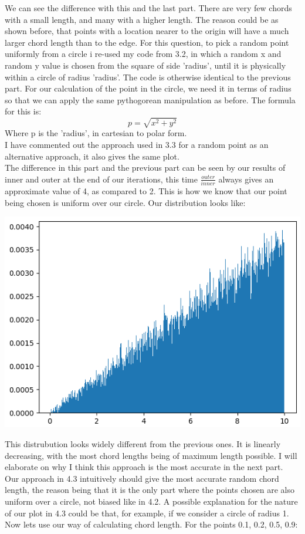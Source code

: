 \documentclass[addpoints]{exam}
\begin{document}
\begin{questions}
\begin{center}
\end{center}
We can see the difference with this and the last part. There are very few chords with a small length, and many with a higher length. The reason could be as shown before, that points with a location nearer to the origin will have a much larger chord length than to the edge.
\newpage
\question
For this question, to pick a random point uniformly from a circle i re-used my code from 3.2, in which a random x and random y value is chosen from the square of side 'radius', until it is physically within a circle of radius 'radius'.  
The code is otherwise identical to the previous part. For our calculation of the point in the circle, we need it in terms of radius so that we can apply the same pythogorean manipulation as before. The formula for this is:\\
\begin{equation}
 p = \sqrt{x^2 + y^2}
\end{equation}
Where p is the 'radius', in cartesian to polar form. \\
I have commented out the approach used in 3.3 for a random point as an alternative approach, it also gives the same plot.\\
The difference in this part and the previous part can be seen by our results of inner and outer at the end of our iterations, this time $\frac{outer}{inner}$ always gives an approximate value of 4, as compared to 2. This is how we know that our point being chosen is uniform over our circle. Our distribution looks like:\\
\begin{center}
\includegraphics[width=.48\textwidth]{images/p4_3_1.png}
\end{center}
This distrubution looks widely different from the previous ones. It is linearly decreasing, with the most chord lengths being of maximum length possible. I will elaborate on why I think this approach is the most accurate in the next part.\\
\newpage
\question
Our approach in 4.3 intuitively should give the most accurate random chord length, the reason being that it is the only part where the points chosen are also uniform over a circle, not biased like in 4.2. A possible explanation for the nature of our plot in 4.3 could be that, for example, if we consider a circle of radius 1. Now lets use our way of calculating chord length. For the points 0.1, 0.2, 0.5, 0.9: \\
\begin{center}


\end{center}
\end{questions}
\end{document}
